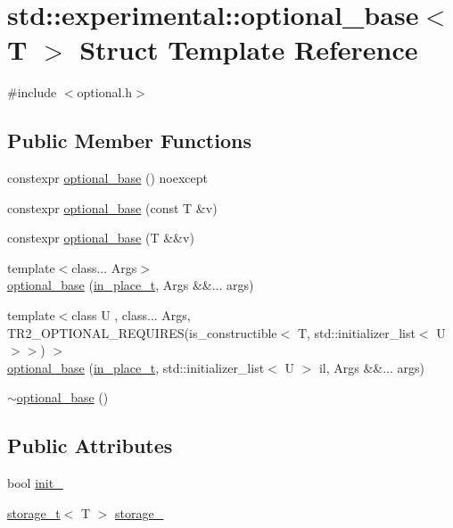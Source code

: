 \hypertarget{structstd_1_1experimental_1_1optional__base}{}\section{std\+:\+:experimental\+:\+:optional\+\_\+base$<$ T $>$ Struct Template Reference}
\label{structstd_1_1experimental_1_1optional__base}


{\ttfamily \#include $<$optional.\+h$>$}

\subsection*{Public Member Functions}
\begin{DoxyCompactItemize}
\item 
constexpr \mbox{\hyperlink{structstd_1_1experimental_1_1optional__base_a31134784c4c482947d66c600fe0dcad4}{optional\+\_\+base}} () noexcept
\item 
constexpr \mbox{\hyperlink{structstd_1_1experimental_1_1optional__base_af47cc844bf9d32ad4361be9934c20939}{optional\+\_\+base}} (const T \&v)
\item 
constexpr \mbox{\hyperlink{structstd_1_1experimental_1_1optional__base_ad4839801777f8cfeb048f16b02df4c44}{optional\+\_\+base}} (T \&\&v)
\item 
{\footnotesize template$<$class... Args$>$ }\\\mbox{\hyperlink{structstd_1_1experimental_1_1optional__base_aa5983374de32e763d1b676ccfe834d05}{optional\+\_\+base}} (\mbox{\hyperlink{structstd_1_1experimental_1_1in__place__t}{in\+\_\+place\+\_\+t}}, Args \&\&... args)
\item 
{\footnotesize template$<$class U , class... Args, T\+R2\+\_\+\+O\+P\+T\+I\+O\+N\+A\+L\+\_\+\+R\+E\+Q\+U\+I\+R\+E\+S(is\+\_\+constructible$<$ T, std\+::initializer\+\_\+list$<$ U $>$$>$) $>$ }\\\mbox{\hyperlink{structstd_1_1experimental_1_1optional__base_ae63b6e3b01c36339007f52f4069c1f4f}{optional\+\_\+base}} (\mbox{\hyperlink{structstd_1_1experimental_1_1in__place__t}{in\+\_\+place\+\_\+t}}, std\+::initializer\+\_\+list$<$ U $>$ il, Args \&\&... args)
\item 
\mbox{\hyperlink{structstd_1_1experimental_1_1optional__base_ad89678b8ebde087b1f3f61466a7436b9}{$\sim$optional\+\_\+base}} ()
\end{DoxyCompactItemize}
\subsection*{Public Attributes}
\begin{DoxyCompactItemize}
\item 
bool \mbox{\hyperlink{structstd_1_1experimental_1_1optional__base_aa0df221e8ebf3abc45c0e78d0b963c01}{init\+\_\+}}
\item 
\mbox{\hyperlink{unionstd_1_1experimental_1_1storage__t}{storage\+\_\+t}}$<$ T $>$ \mbox{\hyperlink{structstd_1_1experimental_1_1optional__base_aa7f2be708eddd8066eee64ef852e4314}{storage\+\_\+}}
\end{DoxyCompactItemize}



